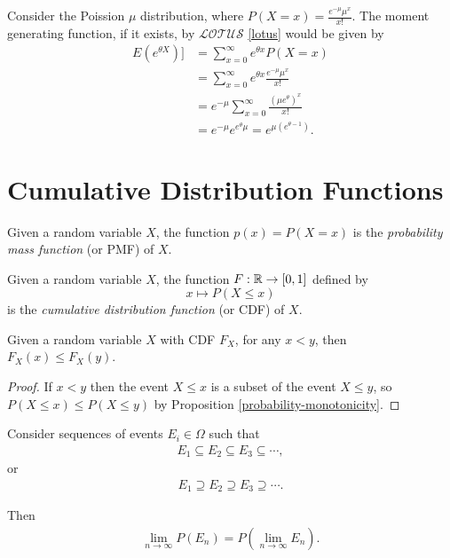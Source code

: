 \begin{exmp}
    Consider the Poission $\mu$ distribution, where $P(X = x) = \frac{e^{-\mu}\mu^x}{x!}$. The moment generating function, if it exists, by $\mathcal{LOTUS}$ \ref{lotus} would be given by
    \begin{align*}
       E(e^{\theta X})] &= \sum_{x=0}^{\infty}e^{\theta x}P(X = x) \\
       &= \sum_{x=0}^{\infty}e^{\theta x}\frac{e^{-\mu}\mu^x}{x!} \\
       &= e^{-\mu}\sum_{x=0}^{\infty}\frac{\left(\mu e^{\theta}\right)^{x}}{x!} \\
       &= e^{-\mu}e^{e^{\theta}\mu} = e^{\mu(e^{\theta-1})}.
    \end{align*}
\end{exmp}

\section{Cumulative Distribution Functions}

\begin{defn}
    Given a random variable $X$, the function $p(x) = P(X = x)$ is the \emph{probability mass function} (or PMF) of $X$.
\end{defn}

\begin{defn}
    Given a random variable $X$, the function $F: \mathbb{R} \to [0, 1]$ defined by
    \[x \mapsto P(X \leq x)\]
    is the \emph{cumulative distribution function} (or CDF) of $X$.
\end{defn}

\begin{prop}
    Given a random variable $X$ with CDF $F_X$, for any $x < y$, then $F_X(x) \leq F_X(y)$.
\end{prop}

\begin{proof}
    If $x < y$ then the event $X \leq x$ is a subset of the event $X \leq y$, so $P(X \leq x) \leq P(X \leq y)$ by Proposition \ref{probability-monotonicity}.
\end{proof}

\begin{thm}\label{event-sequence-probability}
    Consider sequences of events $E_i \in \Omega$ such that
    \begin{align*}
        E_1 \subseteq E_2 \subseteq E_3 \subseteq \cdots,
    \end{align*}
    or
    \begin{align*}
        E_1 \supseteq E_2 \supseteq E_3 \supseteq \cdots.
    \end{align*}

    Then
    \begin{align*}
        \lim_{n \to \infty}P(E_n) = P\left(\lim_{n \to \infty}E_n\right).
    \end{align*}
\end{thm}

